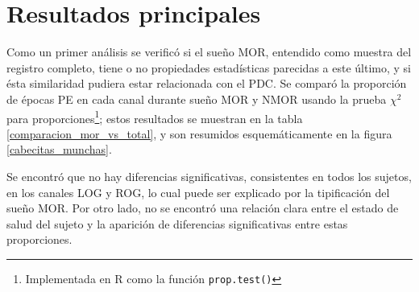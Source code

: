 \documentclass[12pt,a4paper]{mitthesis}
\begin{document}
\section{Resultados principales}

Como un primer an\'alisis se verific\'o si el sue\~no MOR, entendido como muestra del registro
completo, tiene o no propiedades estad\'isticas parecidas a este \'ultimo, y si \'esta similaridad 
pudiera estar relacionada con el PDC. 
Se compar\'o la proporci\'on de \'epocas PE en cada canal durante sue\~no MOR y NMOR usando la 
prueba $\chi^{2}$ para proporciones\footnote{Implementada en R como la funci\'on 
\texttt{prop.test()}}; estos resultados se muestran en la tabla \ref{comparacion_mor_vs_total},
y son resumidos esquem\'aticamente en la figura \ref{cabecitas_munchas}.

Se encontr\'o que no hay diferencias significativas, consistentes en todos los sujetos, en los 
canales LOG y ROG, lo cual puede ser explicado por la tipificaci\'on del sue\~no MOR. 
Por otro lado, no se encontr\'o una relaci\'on clara entre el estado de salud del sujeto y la 
aparici\'on de diferencias significativas entre estas proporciones.
\end{document}
